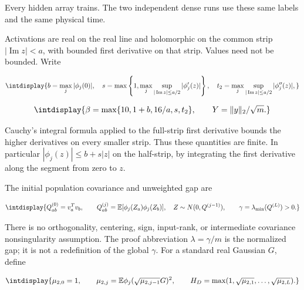 Every hidden array trains. The two independent dense runs use these same labels and the same physical time.



Activations are real on the real line and holomorphic on the common strip \(|\operatorname{Im}z|<a\), with bounded first derivative on that strip. Values need not be bounded. Write


\begingroup\renewcommand{\theHequation}{intdisplay.38}
\begin{equation*}
\intdisplay{
b=\max_j|\phi_j(0)|,\quad
s=\max\left\{1,\max_j\sup_{|\operatorname{Im}z|\le a/2}|\phi_j'(z)|\right\},
\quad t_2=\max_j\sup_{|\operatorname{Im}z|\le a/2}|\phi_j''(z)|,
}
\end{equation*}
\endgroup

\begingroup\renewcommand{\theHequation}{intdisplay.39}
\begin{equation*}
\intdisplay{
\beta=\max\{10,1+b,16/a,s,t_2\},\qquad
Y=\|y\|_2/\sqrt m.
}
\end{equation*}
\endgroup


Cauchy's integral formula applied to the full-strip first derivative bounds the higher derivatives on every smaller strip. Thus these quantities are finite. In particular \(|\phi_j(z)|\le b+s|z|\) on the half-strip, by integrating the first derivative along the segment from zero to \(z\).



The initial population covariance and unweighted gap are


\begingroup\renewcommand{\theHequation}{intdisplay.40}
\begin{equation*}
\intdisplay{
Q^{(0)}_{ab}=v_a^Tv_b,\qquad
Q^{(j)}_{ab}=\mathbb E[\phi_j(Z_a)\phi_j(Z_b)],\quad
Z\sim N(0,Q^{(j-1)}),\qquad
\gamma=\lambda_{\min}(Q^{(L)})>0.
}
\end{equation*}
\endgroup


There is no orthogonality, centering, sign, input-rank, or intermediate covariance nonsingularity assumption. The proof abbreviation \(\lambda=\gamma/m\) is the normalized gap; it is not a redefinition of the global \(\gamma\). For a standard real Gaussian \(G\), define


\begingroup\renewcommand{\theHequation}{intdisplay.41}
\begin{equation*}
\intdisplay{
\mu_{2,0}=1,\qquad
\mu_{2,j}=\mathbb E\phi_j(\sqrt{\mu_{2,j-1}}G)^2,\qquad
H_D=\max(1,\sqrt{\mu_{2,1}},\ldots,\sqrt{\mu_{2,L}}).
}
\end{equation*}
\endgroup

